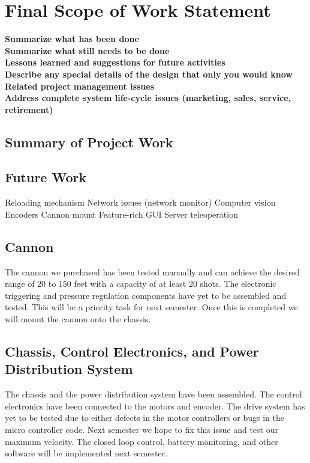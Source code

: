 \documentclass[letterpaper,12pt]{article}
\newcommand{\xxx}[1]{{\color{red}\bf #1}}
\begin{document}
\section{Final Scope of Work Statement}
\label{sec:finalscope}
\xxx{Summarize what has been done} \\
\xxx{Summarize what still needs to be done} \\
\xxx{Lessons learned and suggestions for future activities} \\
\xxx{Describe any special details of the design that only you would know} \\
\xxx{Related project management issues} \\
\xxx{Address complete system life-cycle issues (marketing, sales, service, retirement)}

\subsection{Summary of Project Work}


\subsection{Future Work}
Reloading mechanism
Network issues (network monitor)
Computer vision
Encoders
Cannon mount
Feature-rich GUI
Server teleoperation

\subsection{Cannon}
The cannon we purchased has been tested manually and can achieve the desired
range of 20 to 150 feet with a capacity of at least 20 shots. The electronic
triggering and pressure regulation components have yet to be assembled and
tested. This will be a priority task for next semester. Once this is completed
we will mount the cannon onto the chassis.\\

\subsection{Chassis, Control Electronics, and Power Distribution System}
The chassis and the power distribution system have been assembled. The control
electronics have been connected to the motors and encoder. The drive system has
yet to be tested due to either defects in the motor controllers or bugs in the
micro controller code. Next semester we hope to fix this issue and test our
maximum velocity. The closed loop control, battery monitoring, and other
software will be implemented next semester.\\
\end{document}
